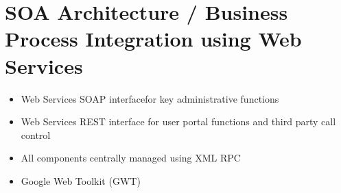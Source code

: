 \documentclass[letterpaper,10pt,english]{sphinxmanual}
\begin{document}
\section{SOA Architecture / Business Process Integration using Web Services}
\label{\detokenize{features:soa-architecture-business-process-integration-using-web-services}}\begin{itemize}
\item {} 
Web Services SOAP interfacefor key administrative functions

\item {} 
Web Services REST interface for user portal functions and third party call control

\item {} 
All components centrally managed using XML RPC

\item {} 
Google Web Toolkit (GWT)

\end{itemize}
\end{document}
